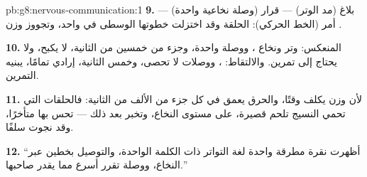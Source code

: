 \begin{solution}{pb:g8:nervous-communication:1}
\textbf{9.} بلاغ (مد الوتر) --- قرار (وصلة نخاعية واحدة)
--- أمر (الخط الحركي): الحلقة وقد اختزلت خطوتها الوسطى
في  واحد، وتجووز وزن .

\textbf{10.} المنعكس: وتر ونخاع ، ووصلة واحدة،
وجزء من خمسين من الثانية، لا يكبح، ولا يحتاج إلى تمرين.
والالتقاط:   ، ووصلات لا تحصى، وخمس
الثانية، إرادي تمامًا، يبنيه التمرين.

\textbf{11.} لأن وزن  يكلف وقتًا، والحرق يعمق في
كل جزء من الألف من الثانية: فالحلقات التي تحمي النسيج
تلحم قصيرة، على مستوى النخاع، وتخبر  بعد ذلك ---
تحس بها متأخرًا، وقد نجوت سلفًا.

\textbf{12.} ``أظهرت نقرة مطرقة واحدة لغة التواتر ذات
الكلمة الواحدة، والتوصيل بخطين عبر النخاع، ووصلة تقرر
أسرع مما يقدر صاحبها.''
\end{solution}
